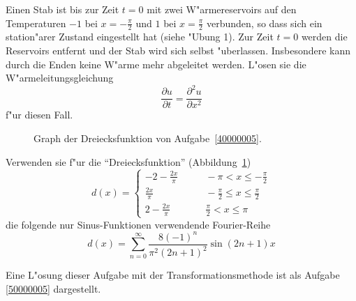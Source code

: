 Einen Stab ist bis zur Zeit $t=0$ mit zwei
W"armereservoirs auf den Temperaturen $-1$ bei $x=-\frac{\pi}2$ und
$1$ bei $x=\frac{\pi}2$ verbunden,
so dass sich ein station"arer Zustand eingestellt hat (siehe
"Ubung 1). Zur Zeit $t=0$ werden die Reservoirs entfernt und der
Stab wird sich selbst "uberlassen. Insbesondere kann durch die
Enden keine W"arme mehr abgeleitet werden. L"osen sie die
W"armeleitungsgleichung
\[
\frac{\partial u}{\partial t}=\frac{\partial^2 u}{\partial x^2}
\]
f"ur diesen Fall.

\begin{hinweis}
\begin{figure}
\centering
{}
\caption{Graph der Dreiecksfunktion von Aufgabe~\ref{40000005}.
\label{40000005:dreieck}}
\end{figure}
Verwenden sie f"ur die
``Dreiecksfunktion'' (Abbildung~\ref{40000005:dreieck})
\[
d(x)
=
\begin{cases}
\displaystyle-2-\frac{2x}{\pi}&\qquad -\pi<x\le \displaystyle-\frac{\pi}2\\
\displaystyle\frac{2x}{\pi}&\qquad \displaystyle-\frac{\pi}2\le x\le \frac{\pi}2\\
\displaystyle2-\frac{2x}{\pi}&\qquad \displaystyle \frac{\pi}2<x\le\pi
\end{cases}
\]
die folgende nur Sinus-Funktionen
verwendende Fourier-Reihe
\[
d(x)=\sum_{n=0}^\infty \frac{8(-1)^n}{\pi^2(2n+1)^2}\sin (2n+1)x
\]
\end{hinweis}

\begin{hinweis}
Eine L"osung dieser Aufgabe mit der Transformationsmethode ist als
Aufgabe \ref{50000005} dargestellt.
\end{hinweis}

